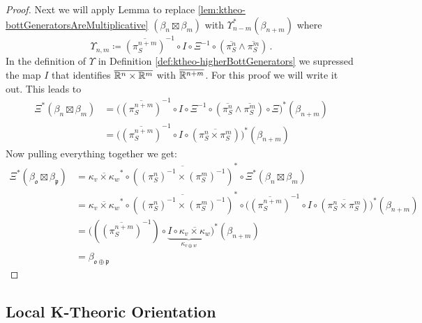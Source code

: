 \begin{proof}
    Next we will apply Lemma to replace \ref{lem:ktheo-bottGeneratorsAreMultiplicative} $(\beta_n \boxtimes \beta_m)$ with $\Upsilon^*_{n-m}(\beta_{n+m})$ where \begin{equation*}
        \Upsilon_{n,m}\coloneq \overline{(\pi_S^{n+m})}^{-1}\circ I \circ  \Xi^{-1}\circ \left(\overline{\pi^n_S}\wedge\overline{\pi^m_S}\right)\,.
    \end{equation*} In the definition of $\Upsilon$ in Definition \ref{def:ktheo-higherBottGenerators} we supressed the map $I$ that identifies $\overline{\mathbb{R}^n\times \mathbb{R}^m}$ with $\overline{\mathbb{R}^{n+m}}$. For this proof we will write it out.
    This leads to 
    \begin{align*}
        \Xi^*(\beta_n\boxtimes \beta_m)
        &=\Big(\overline{(\pi_S^{n+m})}^{-1}\circ I\circ \Xi^{-1}\circ \left(\overline{\pi^n_S}\wedge\overline{\pi^m_S}\right)\circ \Xi\Big)^*(\beta_{n+m})\\
        &=\Big(\overline{(\pi_S^{n+m})}^{-1}\circ I\circ  \left(\overline{\pi^n_S\times \pi^m_S}\right)\Big)^*(\beta_{n+m})
    \end{align*}
 Now pulling everything together we get:
\begin{align*}
    \Xi^{*}\left(\beta_{\mathfrak o}\boxtimes\beta_{\mathfrak p}\right)
    &=\overline{\kappa_v\times \kappa_w}^*\circ \overline{\left((\pi_S^n)^{-1} \times (\pi_S^m)^{-1}\right)}^*\circ \Xi^*(\beta_n\boxtimes \beta_m)\\
    &=\overline{\kappa_v\times \kappa_w}^*\circ \overline{\left((\pi_S^n)^{-1} \times (\pi_S^m)^{-1}\right)}^*\circ \Big(\overline{(\pi_S^{n+m})}^{-1}\circ I\circ  \left(\overline{\pi^n_S\times \pi^m_S}\right)\Big)^*(\beta_{n+m})\\
    &=\Big((\overline{(\pi_S^{n+m})}^{-1}) \circ \underbrace{I \circ  \overline{\kappa_v\times \kappa_w}}_{\kappa_{v\oplus w}}\Big)^* (\beta_{n+m})\\
    &= \beta_{\mathfrak{o}\oplus \mathfrak{p}}
\end{align*}

\end{proof}

\subsection{Local K-Theoric Orientation}


